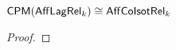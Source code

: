 \begin{theorem}~\\
\label{them:dilation}
 $\mathsf{CPM}(\mathsf{Aff}\mathsf{Lag}\mathsf{Rel}_k) \cong \mathsf{Aff}{\sf Co}{\sf Isot}\mathsf{Rel}_k$
\end{theorem}


\begin{proof}


\end{proof}
